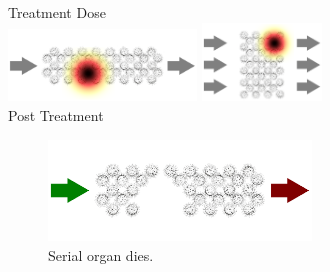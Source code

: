 \begin{figure}
	\begin{subfigure}[b]{0.48\textwidth}
		\caption{Irradiation of organs at risk with one heat point.}
		\label{fig:organ_radiation_point}
		\centering
		\vspace{3mm}
		\hspace{1.2cm}
		Treatment Dose
		\\
		\includegraphics[width=0.55\textwidth]{serial_heat_point.pdf}
		\vbar
		\includegraphics[width=0.35\textwidth]{parallel_heat_point.pdf}
		\\
		\hspace{1.1cm}
		Post Treatment
		\\
		\noindent
		\begin{subfigure}[b]{0.55\textwidth}
			\addtocounter{subfigure}{-1}
			\renewcommand\thesubfigure{\alph{subfigure}1}
			\centering
			\includegraphics[width=\textwidth]{serial_heat_point_post.pdf}
			\vspace{0.5mm}
			\caption{Serial organ dies.}
		\end{subfigure}
		\vbar
		\begin{subfigure}[b]{0.35\textwidth}
			\addtocounter{subfigure}{-1}
			\renewcommand\thesubfigure{\alph{subfigure}2}
			\centering

\end{subfigure}
\end{subfigure}
\end{figure}
